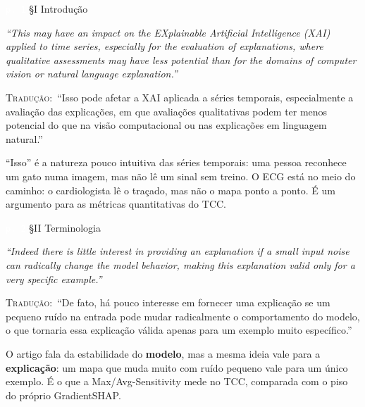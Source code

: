 \documentclass[11pt,a4paper]{article}
\newcommand{\pagechip}[1]{{\setlength{\fboxsep}{1.5pt}\colorbox{cAcc}{\textcolor{white}{\scriptsize\texttt{#1}}}}}
\newenvironment{origquote}{\par\itshape\small}{\par}
\newenvironment{tradquote}{\par\small\textsc{Tradução:}\ }{\par}
\newcommand{\explab}[1]{\par\smallskip{\small\color{cAcc}\textbf{\MakeUppercase{#1}}}\par}
\begin{document}
\begin{citacard}{\pagechip{p. 1} §I Introdução}
\begin{origquote}“This may have an impact on the EXplainable Artificial Intelligence (XAI) applied to time series, especially for the evaluation of explanations, where qualitative assessments may have less potential than for the domains of computer vision or natural language explanation.”\end{origquote}
\begin{tradquote}“Isso pode afetar a XAI aplicada a séries temporais, especialmente a avaliação das explicações, em que avaliações qualitativas podem ter menos potencial do que na visão computacional ou nas explicações em linguagem natural.”\end{tradquote}
\explab{Explicação}
“Isso” é a natureza pouco intuitiva das séries temporais: uma pessoa reconhece um gato numa imagem, mas não lê um sinal sem treino. O ECG está no meio do caminho: o cardiologista lê o traçado, mas não o mapa ponto a ponto. É um argumento para as métricas quantitativas do TCC.
\end{citacard}

\begin{citacard}{\pagechip{p. 2} §II Terminologia}
\begin{origquote}“Indeed there is little interest in providing an explanation if a small input noise can radically change the model behavior, making this explanation valid only for a very specific example.”\end{origquote}
\begin{tradquote}“De fato, há pouco interesse em fornecer uma explicação se um pequeno ruído na entrada pode mudar radicalmente o comportamento do modelo, o que tornaria essa explicação válida apenas para um exemplo muito específico.”\end{tradquote}
\explab{Explicação}
O artigo fala da estabilidade do \textbf{modelo}, mas a mesma ideia vale para a \textbf{explicação}: um mapa que muda muito com ruído pequeno vale para um único exemplo. É o que a Max/Avg-Sensitivity mede no TCC, comparada com o piso do próprio GradientSHAP.
\end{citacard}
\end{document}
